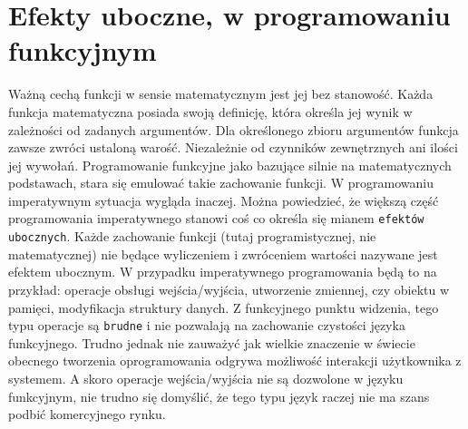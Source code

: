 \documentclass[a4paper,10pt]{report}
\begin{document}
\section{Efekty uboczne, w programowaniu funkcyjnym}
Ważną cechą funkcji w sensie matematycznym jest jej bez stanowość. Każda funkcja matematyczna posiada swoją definicję, która określa jej wynik w zależności od zadanych argumentów. Dla określonego zbioru argumentów funkcja zawsze zwróci ustaloną warość. Niezależnie od czynników zewnętrznych ani ilości jej wywołań. Programowanie funkcyjne jako bazujące silnie na matematycznych podstawach, stara się emulować takie zachowanie funkcji. W programowaniu imperatywnym sytuacja wygląda inaczej. Można powiedzieć, że większą część programowania imperatywnego stanowi coś co określa się mianem \verb|efektów ubocznych|. Każde zachowanie funkcji (tutaj programistycznej, nie matematycznej) nie będące wyliczeniem i zwróceniem wartości nazywane jest efektem ubocznym. W przypadku imperatywnego programowania będą to na przykład: operacje obsługi wejścia/wyjścia, utworzenie zmiennej, czy obiektu w pamięci, modyfikacja struktury danych. Z funkcyjnego punktu widzenia, tego typu operacje są \verb|brudne| i nie pozwalają na zachowanie czystości języka funkcyjnego. Trudno jednak nie zauważyć jak wielkie znaczenie w świecie obecnego tworzenia oprogramowania odgrywa możliwość interakcji użytkownika z systemem. A skoro operacje wejścia/wyjścia nie są dozwolone w języku funkcyjnym, nie trudno się domyślić, że tego typu język raczej nie ma szans podbić komercyjnego rynku.
\end{document}

